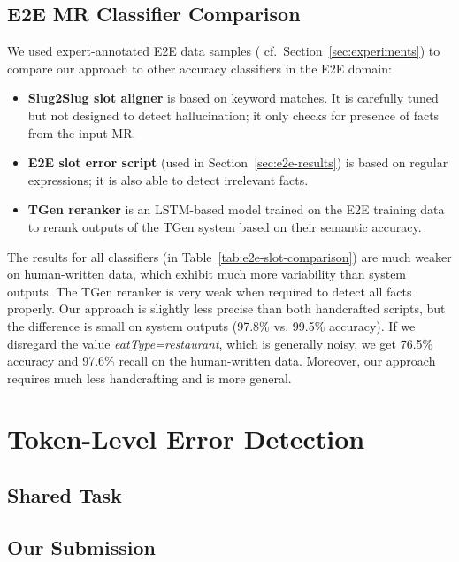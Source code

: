 \subsection{E2E MR Classifier Comparison}
\label{sec:e2e-classifiers}
We used expert-annotated E2E data samples (%
cf.~Section~\ref{sec:experiments}) to compare our approach to other accuracy classifiers in the E2E domain:
\begin{itemize}[nosep,leftmargin=10pt]
    \item \textbf{Slug2Slug slot aligner} \citep{juraska_deep_2018} is based on keyword matches. It is carefully tuned but not designed to detect hallucination; it only checks for presence of facts from the input MR.
    \item \textbf{E2E slot error script} (used in Section~\ref{sec:e2e-results}) is based on regular expressions; it is also able to detect irrelevant facts.
    \item \textbf{TGen reranker} is an LSTM-based model trained on the E2E training data to rerank outputs of the TGen system \cite{dusek_sequence--sequence_2016} based on their semantic accuracy.
\end{itemize}

The results for all classifiers (in Table~\ref{tab:e2e-slot-comparison}) are much weaker on human-written data, which exhibit much more variability than system outputs.
The TGen reranker is very weak when required to detect all facts properly.
Our approach is slightly less precise than both handcrafted scripts, but the difference is small on system outputs (97.8\% vs. 99.5\% accuracy). If we disregard the value \emph{eatType=restaurant}, which is generally noisy, we get 76.5\% accuracy and 97.6\% recall on the human-written data. Moreover, our approach requires much less handcrafting and is more general.


\section{Token-Level Error Detection}
\label{sec:eval-token}
\subsection{Shared Task}
\label{sec:eval-st}
\subsection{Our Submission}
\label{sec:eval-ours}